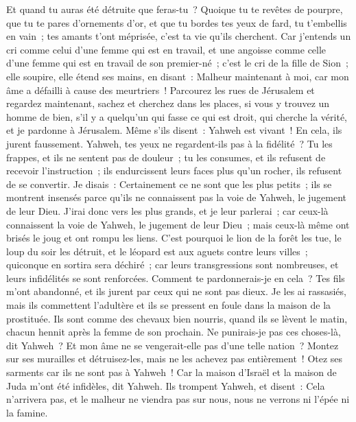 \begin{multicols}{2}
Et quand tu auras été détruite que feras-tu~? Quoique tu te revêtes de pourpre, que tu te pares d'ornements d'or, et que tu bordes tes yeux de fard, tu t'embellis en vain~; tes amants t'ont méprisée, c'est ta vie qu'ils cherchent.
Car j'entends un cri comme celui d'une femme qui est en travail, et une angoisse comme celle d'une femme qui est en travail de son premier-né~; c'est le cri de la fille de Sion~; elle soupire, elle étend ses mains, en disant~: Malheur maintenant à moi, car mon âme a défailli à cause des meurtriers~! 
\VerseOne{}Parcourez les rues de Jérusalem et regardez maintenant, sachez et cherchez dans les places, si vous y trouvez un homme de bien, s'il y a quelqu'un qui fasse ce qui est droit, qui cherche la vérité, et je pardonne à Jérusalem.
Même s'ils disent~: Yahweh est vivant~! En cela, ils jurent faussement.
Yahweh, tes yeux ne regardent-ils pas à la fidélité~? Tu les frappes, et ils ne sentent pas de douleur~; tu les consumes, et ils refusent de recevoir l'instruction~; ils endurcissent leurs faces plus qu'un rocher, ils refusent de se convertir.
Je disais~: Certainement ce ne sont que les plus petits~; ils se montrent insensés parce qu'ils ne connaissent pas la voie de Yahweh, le jugement de leur Dieu.
J'irai donc vers les plus grands, et je leur parlerai~; car ceux-là connaissent la voie de Yahweh, le jugement de leur Dieu~; mais ceux-là même ont brisés le joug et ont rompu les liens.
C'est pourquoi le lion de la forêt les tue, le loup du soir les détruit, et le léopard est aux aguets contre leurs villes~; quiconque en sortira sera déchiré~; car leurs transgressions sont nombreuses, et leurs infidélités se sont renforcées.
Comment te pardonnerais-je en cela~? Tes fils m'ont abandonné, et ils jurent par ceux qui ne sont pas dieux. Je les ai rassasiés, mais ils commettent l'adultère et ils se pressent en foule dans la maison de la prostituée.
Ils sont comme des chevaux bien nourris, quand ils se lèvent le matin, chacun hennit après la femme de son prochain.
Ne punirais-je pas ces choses-là, dit Yahweh~? Et mon âme ne se vengerait-elle pas d'une telle nation~?
Montez sur ses murailles et détruisez-les, mais ne les achevez pas entièrement~! Otez ses sarments car ils ne sont pas à Yahweh~!
Car la maison d'Israël et la maison de Juda m'ont été infidèles, dit Yahweh.
Ils trompent Yahweh, et disent~: Cela n'arrivera pas, et le malheur ne viendra pas sur nous, nous ne verrons ni l'épée ni la famine.

\end{multicols}

